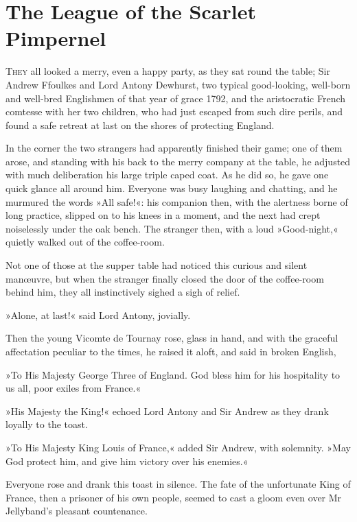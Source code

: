 
\chapter{The League of the Scarlet Pimpernel}

\lettrine[lines=4]{T}{hey} all looked a merry, even a happy party, as they sat round the table; Sir Andrew Ffoulkes and Lord Antony Dewhurst, two typical good-looking, well-born and well-bred Englishmen of that year of grace 1792, and the aristocratic French comtesse with her two children, who had just escaped from such dire perils, and found a safe retreat at last on the shores of protecting England.

In the corner the two strangers had apparently finished their game; one of them arose, and standing with his back to the merry company at the table, he adjusted with much deliberation his large triple caped coat. As he did so, he gave one quick glance all around him. Everyone was busy laughing and chatting, and he murmured the words »All safe!«: his companion then, with the alertness borne of long practice, slipped on to his knees in a moment, and the next had crept noiselessly under the oak bench. The stranger then, with a loud »Good-night,« quietly walked out of the coffee-room.

Not one of those at the supper table had noticed this curious and silent manœuvre, but when the stranger finally closed the door of the coffee-room behind him, they all instinctively sighed a sigh of relief.

»Alone, at last!« said Lord Antony, jovially.

Then the young Vicomte de Tournay rose, glass in hand, and with the graceful affectation peculiar to the times, he raised it aloft, and said in broken English,\longdash


»To His Majesty George Three of England. God bless him for his hospitality to us all, poor exiles from France.«

»His Majesty the King!« echoed Lord Antony and Sir Andrew as they drank loyally to the toast.

»To His Majesty King Louis of France,« added Sir Andrew, with solemnity. »May God protect him, and give him victory over his enemies.«

Everyone rose and drank this toast in silence. The fate of the unfortunate King of France, then a prisoner of his own people, seemed to cast a gloom even over Mr Jellyband's pleasant countenance.

